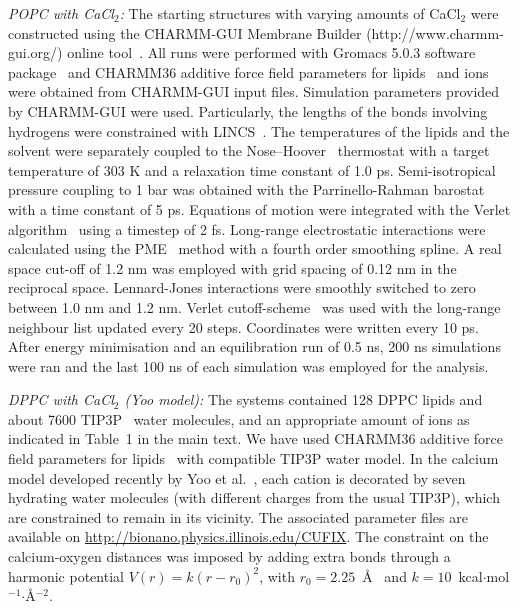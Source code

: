 \documentclass[twoside,twocolumn,9pt]{article}
\begin{document}
{\it POPC with CaCl$_2$:}
The starting structures with varying amounts of CaCl$_2$ were constructed using the CHARMM-GUI Membrane Builder (http://www.charmm-gui.org/) online tool~\cite{lee15}. 
All runs were performed with Gromacs 5.0.3 software package~\cite{abraham15} and CHARMM36 additive force field parameters for lipids~\cite{klauda10} and ions were obtained from CHARMM-GUI input files. 
Simulation parameters provided by CHARMM-GUI were used.
Particularly, the lengths of the bonds involving hydrogens were constrained with LINCS~\cite{hess97,hess07}. The temperatures of the 
lipids and the solvent were separately coupled to the Nose--Hoover~\cite{nose84,hoover85} thermostat with a target temperature of 303 K and a relaxation time constant of 1.0 ps. Semi-isotropical 
pressure coupling to 1 bar was obtained with the Parrinello-Rahman barostat~\cite{parrinello81} with a time constant of 5 ps. Equations of motion were integrated with the Verlet algorithm~\cite{pall13} 
using a timestep of 2 fs. Long-range electrostatic interactions were calculated using the PME~\cite{darden93,essman95} method with a fourth order smoothing spline. A real space cut-off of 1.2 nm 
was employed with grid spacing of 0.12 nm in the reciprocal space. Lennard-Jones interactions were smoothly switched to zero between 1.0 nm and 1.2 nm. Verlet cutoff-scheme~\cite{pall13}  
was used with the long-range neighbour list updated every 20 steps. Coordinates were written every 10 ps.
After energy minimisation and an equilibration run of 0.5 ns, 200 ns simulations were ran and the last 100 ns of each simulation was employed for the analysis.

{\it DPPC with CaCl$_2$ (Yoo model):}
The systems contained 128 DPPC lipids and about 7600 TIP3P~\cite{jorgensen83} water molecules,
and an appropriate amount of ions as indicated in  Table~1 in the main text.  
We have used CHARMM36 additive force field parameters for lipids~\cite{klauda10} with compatible TIP3P water model. 
In the calcium model developed recently by Yoo et al.~\cite{yoo16}, 
each cation is decorated by seven hydrating water molecules (with different charges from the usual TIP3P),
which are constrained to remain in its vicinity. The associated parameter files are available
on \url{http://bionano.physics.illinois.edu/CUFIX}. The constraint on the calcium-oxygen distances
was imposed by adding extra bonds through a harmonic potential $V(r) = k(r-r_0)^2$, 
with $r_0=2.25$~\AA~ and $k=10$~kcal$\cdot$mol$^{-1}$$\cdot$\AA$^{-2}$.
 
\end{document}
